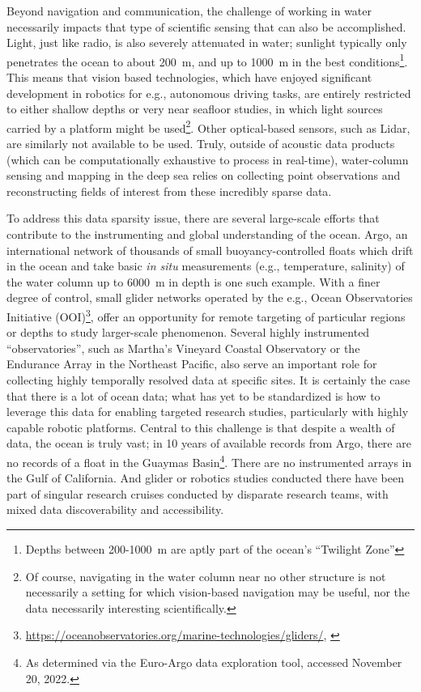 Beyond navigation and communication, the challenge of working in water necessarily impacts that type of scientific sensing that can also be accomplished. Light, just like radio, is also severely attenuated in water; sunlight typically only penetrates the ocean to about \SI{200}{\meter}, and up to \SI{1000}{\meter} in the best conditions\footnote{Depths between 200-\SI{1000}{\meter} are aptly part of the ocean's ``Twilight Zone''\autocite{martin2020oceans}}. This means that vision based technologies, which have enjoyed significant development in robotics for e.g., autonomous driving tasks, are entirely restricted to either shallow depths or very near seafloor studies, in which light sources carried by a platform might be used\footnote{Of course, navigating in the water column near no other structure is not necessarily a setting for which vision-based navigation may be useful, nor the data necessarily interesting scientifically.}. Other optical-based sensors, such as Lidar, are similarly not available to be used. Truly, outside of acoustic data products (which can be computationally exhaustive to process in real-time), water-column sensing and mapping in the deep sea relies on collecting point observations and reconstructing fields of interest from these incredibly sparse data.

To address this data sparsity issue, there are several large-scale efforts that contribute to the instrumenting and global understanding of the ocean. Argo, an international network of thousands of small buoyancy-controlled floats which drift in the ocean and take basic \emph{in situ} measurements (e.g., temperature, salinity) of the water column up to \SI{6000}{\meter} in depth is one such example\autocite{roemmich2009argo,jayne2017argo}. With a finer degree of control, small glider networks operated by the e.g., Ocean Observatories Initiative (OOI)\footnote{\url{https://oceanobservatories.org/marine-technologies/gliders/}, \autocite{trowbridge2019ocean}}, offer an opportunity for remote targeting of particular regions or depths to study larger-scale phenomenon. Several highly instrumented ``observatories'', such as Martha's Vineyard Coastal Observatory\autocite{austin2000martha} or the Endurance Array in the Northeast Pacific\autocite{barth2018warm}, also serve an important role for collecting highly temporally resolved data at specific sites. It is certainly the case that there is a lot of ocean data; what has yet to be standardized is how to leverage this data for enabling targeted research studies, particularly with highly capable robotic platforms. Central to this challenge is that despite a wealth of data, the ocean is truly vast; in 10 years of available records from Argo, there are no records of a float in the Guaymas Basin\footnote{As determined via the Euro-Argo data exploration tool, accessed November 20, 2022.}. There are no instrumented arrays in the Gulf of California. And glider or robotics studies conducted there have been part of singular research cruises conducted by disparate research teams, with mixed data discoverability and accessibility. 

